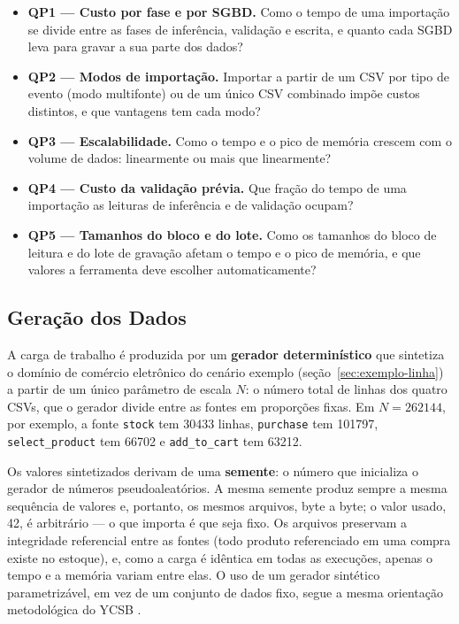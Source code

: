 \begin{itemize}
  \item \textbf{QP1 --- Custo por fase e por SGBD.} Como o tempo de uma importação se divide
        entre as fases de inferência, validação e escrita, e quanto cada SGBD leva para
        gravar a sua parte dos dados?
  \item \textbf{QP2 --- Modos de importação.} Importar a partir de um CSV por tipo de evento
        (modo multifonte) ou de um único CSV combinado impõe custos distintos, e que
        vantagens tem cada modo?
  \item \textbf{QP3 --- Escalabilidade.} Como o tempo e o pico de memória crescem com o
        volume de dados: linearmente ou mais que linearmente?
  \item \textbf{QP4 --- Custo da validação prévia.} Que fração do tempo de uma importação as
        leituras de inferência e de validação ocupam?
  \item \textbf{QP5 --- Tamanhos do bloco e do lote.} Como os tamanhos do bloco de leitura e
        do lote de gravação afetam o tempo e o pico de memória, e que valores a ferramenta
        deve escolher automaticamente?
\end{itemize}

\subsection{Geração dos Dados}
\label{sec:geracao-dados}

A carga de trabalho é produzida por um \textbf{gerador determinístico} que sintetiza o
domínio de comércio eletrônico do cenário exemplo (seção~\ref{sec:exemplo-linha}) a partir de
um único parâmetro de escala $N$: o número total de linhas dos quatro CSVs, que o gerador
divide entre as fontes em proporções fixas. Em $N = \num{262144}$, por exemplo, a fonte
\texttt{stock} tem \num{30433} linhas, \texttt{purchase} tem \num{101797},
\texttt{select\_product} tem \num{66702} e \texttt{add\_to\_cart} tem \num{63212}.

Os valores sintetizados derivam de uma \textbf{semente}: o número que inicializa o gerador
de números pseudoaleatórios. A mesma semente produz sempre a mesma sequência de valores e,
portanto, os mesmos arquivos, byte a byte; o valor usado, 42, é arbitrário --- o que
importa é que seja fixo. Os arquivos preservam a integridade referencial entre as fontes
(todo produto referenciado em uma compra existe no estoque), e, como a carga é idêntica em
todas as execuções, apenas o tempo e a memória variam entre elas. O uso de um gerador
sintético parametrizável, em vez de um conjunto de dados fixo, segue a mesma orientação
metodológica do YCSB \cite{cooper2010benchmarking}.

